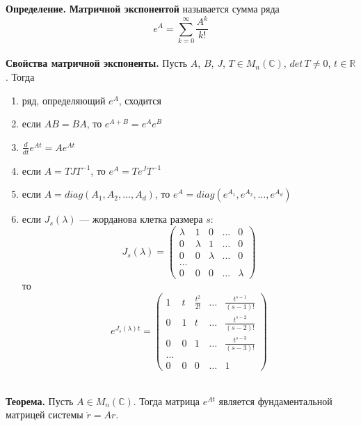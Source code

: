 \documentclass{article}
\begin{document}
\noindent \textbf{Определение.} \textbf{Матричной экспонентой} называется сумма ряда
\begin{equation*}
    e^{A} = \sum_{k = 0}^{\infty} \frac{A^k}{k!}
\end{equation*}
\\
\noindent \textbf{Свойства матричной экспоненты.} Пусть $A$, $B$, $J$, $T \in M_n(\mathbb{C})$, $det\, T \neq 0$, $t \in \mathbb{R}$. Тогда
\begin{enumerate}
    \item ряд, определяющий $e^A$, сходится
    \item если $AB = BA$, то $e^{A+B} = e^{A}e^{B}$
    \item $\frac{d}{dt}e^{At} = Ae^{At}$
    \item если $A = TJT^{-1}$, то $e^A = Te^JT^{-1}$
    \item если $A = diag(A_1, A_2, \ldots, A_d)$, то $e^A = diag(e^{A_1}, e^{A_2}, \ldots, e^{A_d})$
    \item если $J_s(\lambda)$ --- жорданова клетка размера $s$:
    \begin{equation*}
        J_s(\lambda) = \begin{pmatrix}
            \lambda & 1 & 0 & \ldots & 0\\
            0 & \lambda & 1 & \ldots & 0\\
            0 & 0 & \lambda & \ldots & 0\\
            \ldots\\
            0 & 0 & 0 & \ldots & \lambda
        \end{pmatrix}
    \end{equation*}
    то
    \begin{equation*}
        e^{J_s(\lambda)t} = \begin{pmatrix}
        1 & t & \frac{t^2}{2!} & \ldots & \frac{t^{s-1}}{(s-1)!}\\
        0 & 1 & t & \ldots & \frac{t^{s-2}}{(s-2)!}\\
        0 & 0 & 1 & \ldots & \frac{t^{s-3}}{(s-3)!}\\
        \ldots\\
        0 & 0 & 0 & \ldots & 1
        \end{pmatrix}
    \end{equation*}
\end{enumerate}
\\
\noindent \textbf{Теорема.} Пусть $A \in M_n(\mathbb{C})$. Тогда матрица $e^{At}$ является фундаментальной матрицей системы $\dot{r} = Ar$.\\
\end{document}
